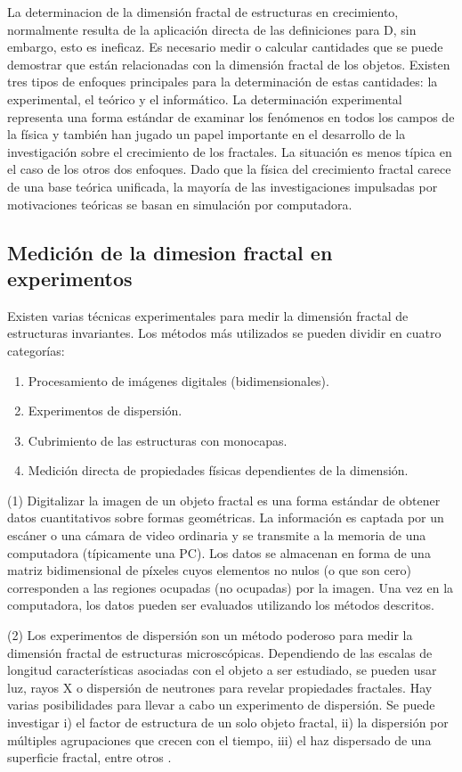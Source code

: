 \documentclass[11pt]{article}
\begin{document}
La determinacion de la dimensión fractal de estructuras en crecimiento, normalmente resulta de la aplicación directa de las definiciones para D, sin embargo, esto es ineficaz. Es necesario medir o calcular cantidades que se puede demostrar que están relacionadas con la dimensión fractal de los objetos. Existen  tres tipos de enfoques principales para la determinación de estas cantidades: la experimental, el teórico y el informático. La determinación experimental representa una forma estándar de examinar los fenómenos en todos los campos de la física y también han jugado un papel importante en el desarrollo de la investigación sobre el crecimiento de los fractales. La situación es menos típica en el caso de los otros dos enfoques. Dado que la física del crecimiento fractal carece de una base teórica unificada, la mayoría de las investigaciones impulsadas por motivaciones teóricas se basan en simulación por computadora.


\subsection{Medición de la dimesion fractal en experimentos}

Existen varias técnicas experimentales para medir la dimensión fractal de estructuras invariantes. Los métodos más utilizados se pueden dividir en cuatro categorías:

\begin{enumerate}
\item Procesamiento de imágenes digitales (bidimensionales).
\item Experimentos de dispersión.
\item Cubrimiento de las estructuras con monocapas. 
\item Medición directa de propiedades físicas dependientes de la dimensión.
\end{enumerate}

(1) Digitalizar la imagen de un objeto fractal es una forma estándar de obtener datos cuantitativos sobre formas geométricas. La información es captada por un escáner o una cámara de video ordinaria y se transmite a la memoria de una computadora (típicamente una PC). Los datos se almacenan en forma de una matriz bidimensional de píxeles cuyos elementos no nulos (o que son cero) corresponden a las regiones ocupadas (no ocupadas) por la imagen. Una vez en la computadora, los datos pueden ser evaluados utilizando los métodos descritos.

(2) Los experimentos de dispersión son un método poderoso para medir la dimensión fractal de estructuras microscópicas. Dependiendo de las escalas de longitud características asociadas con el objeto a ser estudiado, se pueden usar luz, rayos X o dispersión de neutrones para revelar propiedades fractales. Hay varias posibilidades para llevar a cabo un experimento de dispersión. Se puede investigar i) el factor de estructura de un solo objeto fractal, ii) la dispersión por múltiples agrupaciones que crecen con el tiempo, iii) el haz dispersado de una superficie fractal, entre otros \cite{Vicsek1992}.
\end{document}
